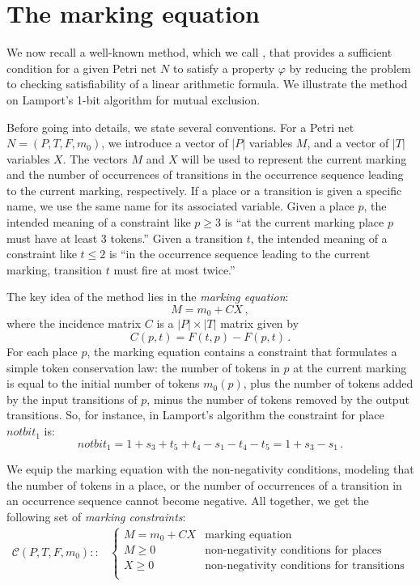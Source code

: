 \section{The marking equation}
\label{sec:the_marking_equation}

We now recall a well-known method, which we call \safety, that provides a sufficient
condition for a given Petri net $N$ to satisfy a property $\varphi$ 
by reducing the problem to checking satisfiability of a linear arithmetic formula.
We illustrate the method on Lamport's 1-bit algorithm for mutual
exclusion. 

Before going into details, we state several conventions. For a
Petri net $N = (P, T, F, m_0)$, we introduce a vector of
$|P|$ variables $M$, and a vector of $|T|$ variables $X$.
The vectors $M$ and $X$ will be used to represent the current
marking and the number of occurrences
of transitions in the occurrence sequence leading to the current marking, respectively.
If a place or a transition is given a specific
name, we use the same name for its associated variable. Given a place
$p$, the intended meaning of a constraint like $p \geq 3$ is 
``at the current marking place $p$ must have at least 3 tokens.'' 
Given a transition $t$, the intended meaning of a constraint like $t \leq 2$ is ``in
the occurrence sequence leading to the current marking, transition $t$
must fire at most twice.'' 

The key idea of the \safety{} method lies in the \emph{marking
  equation}:
$$M = m_0 + C X\,,$$
where the incidence matrix $C$ is a $|P| \times |T|$ matrix given by
$$C(p,t) = F(t,p) - F(p,t)\,.$$
For each place $p$, the marking equation contains a constraint
that formulates a simple token conservation law: the number of tokens in
$p$ at the current marking is equal to the initial number of tokens $m_0(p)$,
plus the number of tokens added by the input transitions of $p$, minus
the number of tokens removed by the output transitions. 
So, for instance, in Lamport's algorithm the constraint for place $notbit_1$
is:
$$notbit_1 = 1 + s_3 + t_5 + t_4 - s_1 - t_4 - t_5 = 1 +s_3
-s_1\,.$$

We equip the marking equation with the non-negativity conditions,
modeling that the number of tokens in a place, or the number of
occurrences of a transition in an occurrence sequence cannot become
negative. All together, we get the following set of \emph{marking constraints}:
\begin{align*}
  \mathcal{C}(P, T, F, m_0) ::&
  \begin{cases}
    M = m_0 + C X  & \text{marking equation} \\
    M \ge 0        & \text{non-negativity conditions for places} \\
    X \ge 0        & \text{non-negativity conditions for transitions} \\
  \end{cases}
\end{align*}

